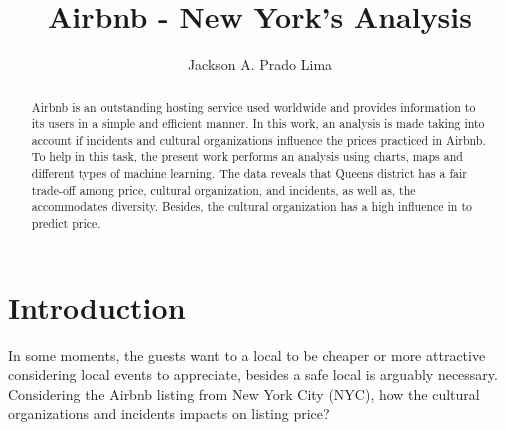 \documentclass[sigconf]{acmart}
\begin{document}
	
\title{Airbnb - New York’s Analysis}

\author{Jackson A. Prado Lima}
	
\renewcommand{\shortauthors}{J. A. Prado Lima}
\renewcommand{\shorttitle}{Airbnb - New York’s Analysis}

\begin{abstract}
	Airbnb is an outstanding hosting service used worldwide and provides information to its users in a simple and efficient manner. In this work, an analysis is made taking into account if incidents and cultural organizations influence the prices practiced in Airbnb. To help in this task, the present work performs an analysis using charts, maps and different types of machine learning. The data reveals that Queens district has a fair trade-off among price, cultural organization, and incidents, as well as, the accommodates diversity. Besides, the cultural organization has a high influence in to predict price.
\end{abstract}


\maketitle

\section{Introduction}


In some moments, the guests want to a local to be cheaper or more attractive considering local events to appreciate, besides a safe local is arguably necessary. Considering the Airbnb listing from New York City (NYC), how the cultural organizations and incidents impacts on listing price? 
\end{document}
